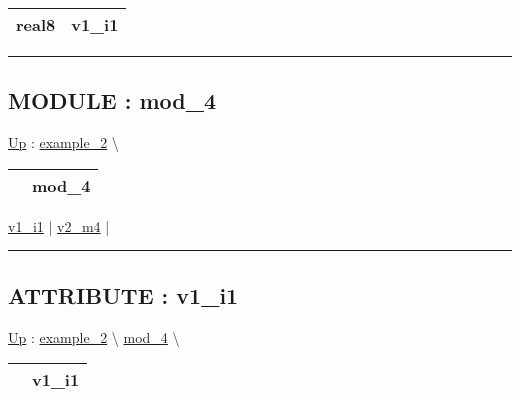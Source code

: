 {\renewcommand{\arraystretch}{1.5}
\begin{tabularx}{\textwidth}{|>{\raggedright\arraybackslash}l|X|}
\hline
\hspace{0pt}real8 & v1\_i1 \\
\hline
\end{tabularx}
}

\par


\rule{\linewidth}{0.5pt}


\subsection*{MODULE : mod\_4}
\hypertarget{ecldoc:intest.inintest.example_2.mod_4}{}
\hyperlink{ecldoc:intest.inintest.example_2}{Up} :
\hspace{0pt} \hyperlink{ecldoc:intest.inintest.example_2}{example_2} \textbackslash 

{\renewcommand{\arraystretch}{1.5}
\begin{tabularx}{\textwidth}{|>{\raggedright\arraybackslash}l|X|}
\hline
\hspace{0pt} & mod\_4 \\
\hline
\end{tabularx}
}

\par


\hyperlink{ecldoc:intest.inintest.example_2.mod_4.v1_i1}{v1\_i1}  |
\hyperlink{ecldoc:intest.inintest.example_2.mod_4.v2_m4}{v2\_m4}  |

\rule{\linewidth}{0.5pt}

\subsection*{ATTRIBUTE : v1\_i1}
\hypertarget{ecldoc:intest.inintest.example_2.mod_4.v1_i1}{}
\hyperlink{ecldoc:intest.inintest.example_2.mod_4}{Up} :
\hspace{0pt} \hyperlink{ecldoc:intest.inintest.example_2}{example_2} \textbackslash 
\hspace{0pt} \hyperlink{ecldoc:intest.inintest.example_2.mod_4}{mod_4} \textbackslash 

{\renewcommand{\arraystretch}{1.5}
\begin{tabularx}{\textwidth}{|>{\raggedright\arraybackslash}l|X|}
\hline
\hspace{0pt} & v1\_i1 \\
\hline
\end{tabularx}
}

